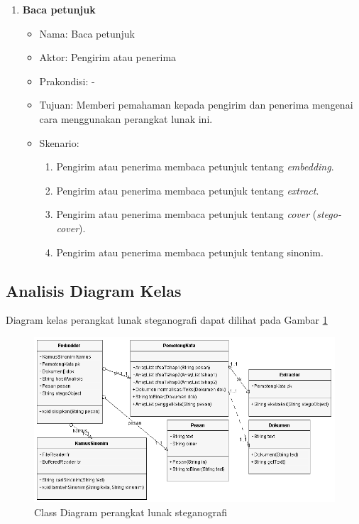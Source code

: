 \begin{enumerate}
	\item \textbf{Baca petunjuk}
	\begin{itemize}
		\item Nama: Baca petunjuk
		\item Aktor: Pengirim atau penerima
		\item Prakondisi: -
		\item Tujuan: Memberi pemahaman kepada pengirim dan penerima mengenai cara menggunakan perangkat lunak ini.
		\item Skenario:
		\renewcommand{\labelenumii}{\arabic{enumii}.}
			\begin{enumerate}
				\item Pengirim atau penerima membaca petunjuk tentang \textit{embedding}.
				\item Pengirim atau penerima membaca petunjuk tentang \textit{extract}.
				\item Pengirim atau penerima membaca petunjuk tentang \textit{cover} (\textit{stego-cover}).
				\item Pengirim atau penerima membaca petunjuk tentang sinonim.
			\end{enumerate}
	\end{itemize}
\end{enumerate}

\subsection{Analisis Diagram Kelas}

Diagram kelas perangkat lunak steganografi dapat dilihat pada Gambar \ref{fig:3_classdiagram}

\begin{figure}[H]
	\centering
	\includegraphics[scale=0.8]{Gambar/classdiagram}
	\caption{Class Diagram perangkat lunak steganografi} 
	\label{fig:3_classdiagram}
\end{figure}

